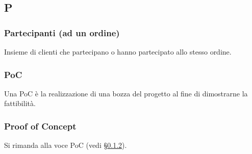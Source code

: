 \subsection{P}

\subsubsection{Partecipanti (ad un ordine)}
Insieme di clienti che partecipano o hanno partecipato allo stesso ordine.

\subsubsection{PoC}
\label{poc}
Una PoC è la realizzazione di una bozza del progetto al fine di dimostrarne la fattibilità.

\subsubsection{Proof of Concept}
Si rimanda alla voce PoC (vedi \S\ref{poc}).

\newpage

